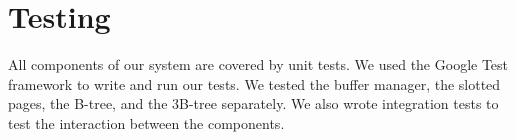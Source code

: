 \section{Testing}
All components of our system are covered by unit tests.
We used the Google Test framework to write and run our tests.
We tested the buffer manager, the slotted pages, the B-tree, and the 3B-tree separately.
We also wrote integration tests to test the interaction between the components.













